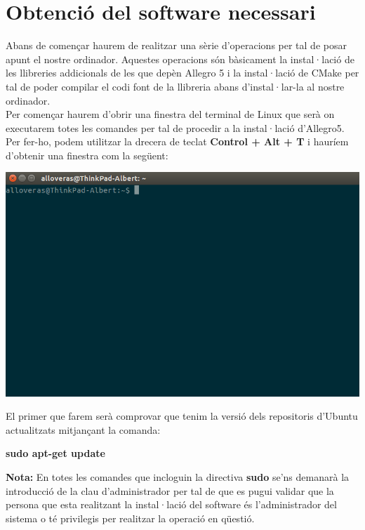 \documentclass[11pt]{article}
\begin{document}
\section{Obtenció del software necessari}
 Abans de començar haurem de realitzar una sèrie d'operacions per tal de posar apunt el nostre ordinador. Aquestes operacions són bàsicament la instal·lació de les llibreries addicionals de les que depèn Allegro 5 i la instal·lació de CMake per tal de poder compilar el codi font de la llibreria abans d'instal·lar-la al nostre ordinador.\\

\noindent Per començar haurem d'obrir una finestra del terminal de Linux que serà on executarem totes les comandes per tal de procedir a la instal·lació d'Allegro5. Per fer-ho, podem utilitzar la drecera de teclat \textbf{Control + Alt + T} i hauríem d'obtenir una finestra com la següent:

\begin{center}
	\includegraphics[scale=0.4]{img/Linux_Terminal.png}
\end{center}

\pagebreak
\noindent El primer que farem serà comprovar que tenim la versió dels repositoris d'Ubuntu actualitzats mitjançant la comanda:

\begin{center}
	\textbf{sudo apt-get update}
\end{center}

\noindent \textbf{Nota:} En totes les comandes que incloguin la directiva \textbf{sudo} se'ns demanarà la introducció de la clau d'administrador per tal de que es pugui validar que la persona que esta realitzant la instal·lació del software és l'administrador del sistema o té privilegis per realitzar la operació en qüestió.
\end{document}
